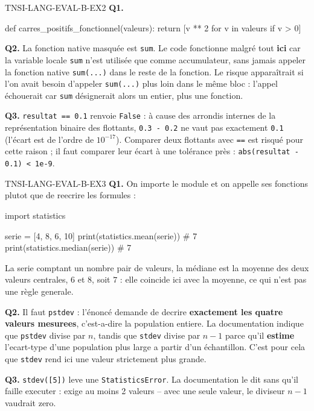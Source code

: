 \begin{corrige}{TNSI-LANG-EVAL-B-EX2}
\textbf{Q1.}
\begin{python}
def carres_positifs_fonctionnel(valeurs):
    return [v ** 2 for v in valeurs if v > 0]
\end{python}

\textbf{Q2.} La fonction native masquée est \lstinline{sum}. Le code fonctionne malgré tout \textbf{ici} car la variable locale \lstinline{sum} n'est utilisée que comme accumulateur, sans jamais appeler la fonction native \lstinline{sum(...)} dans le reste de la fonction. Le risque apparaîtrait si l'on avait besoin d'appeler \lstinline{sum(...)} plus loin dans le même bloc : l'appel échouerait car \lstinline{sum} désignerait alors un entier, plus une fonction.

\textbf{Q3.} \lstinline{resultat == 0.1} renvoie \lstinline{False} : à cause des arrondis internes de la représentation binaire des flottants, \lstinline{0.3 - 0.2} ne vaut pas exactement \lstinline{0.1} (l'écart est de l'ordre de $10^{-17}$). Comparer deux flottants avec \lstinline{==} est risqué pour cette raison ; il faut comparer leur écart à une tolérance près : \lstinline{abs(resultat - 0.1) < 1e-9}.
\end{corrige}

\begin{corrige}{TNSI-LANG-EVAL-B-EX3}
\textbf{Q1.} On importe le module et on appelle ses fonctions plutot que de reecrire les
formules :

\begin{python}
import statistics

serie = [4, 8, 6, 10]
print(statistics.mean(serie))    # 7
print(statistics.median(serie))  # 7
\end{python}
La serie comptant un nombre pair de valeurs, la médiane est la moyenne des deux valeurs
centrales, $6$ et $8$, soit $7$ : elle coincide ici avec la moyenne, ce qui n'est pas une
règle generale.

\textbf{Q2.} Il faut \lstinline{pstdev} : l'énoncé demande de decrire \textbf{exactement les
quatre valeurs mesurees}, c'est-a-dire la population entiere. La documentation indique que
\lstinline{pstdev} divise par $n$, tandis que \lstinline{stdev} divise par $n-1$ parce qu'il
\textbf{estime} l'ecart-type d'une population plus large a partir d'un échantillon. C'est
pour cela que \lstinline{stdev} rend ici une valeur strictement plus grande.

\textbf{Q3.} \lstinline{stdev([5])} leve une \lstinline{StatisticsError}. La documentation le
dit sans qu'il faille executer : \og{} exige au moins 2 valeurs \fg{} -- avec une seule
valeur, le diviseur $n-1$ vaudrait zero.
\end{corrige}

